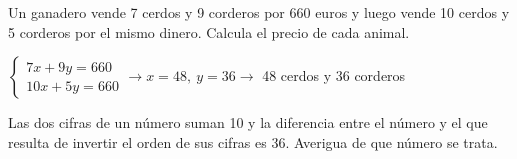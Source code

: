 \documentclass[spanish, 11pt]{exam}
\begin{document}
\begin{questions}
\begin{multicols}{3}
                
        \end{multicols}

        
        
        \question Un ganadero vende 7 cerdos y 9 corderos por 660 euros y luego vende 10 cerdos y 5 corderos por el mismo dinero. Calcula el precio de cada animal.
\begin{solution} $\left\{\begin{matrix}7x+9y=660 \\ 10x+5y=660\end{matrix}\right. \to  x = 48, \  y = 36 \to$ 48 cerdos y 36 corderos \end{solution}

\question Las dos cifras de un número suman 10 y la diferencia entre el número y el que resulta de invertir el orden de sus cifras es 36. Averigua de que número se trata.


\end{questions}
\end{document}

